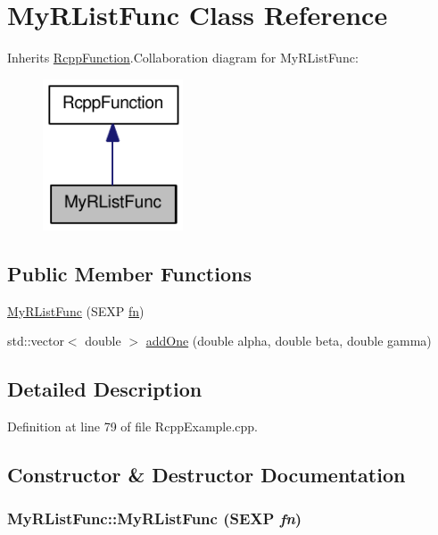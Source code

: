 \hypertarget{classMyRListFunc}{
\section{MyRListFunc Class Reference}
\label{classMyRListFunc}
}


Inherits \hyperlink{classRcppFunction}{RcppFunction}.Collaboration diagram for MyRListFunc:\nopagebreak
\begin{figure}[H]
\begin{center}
\leavevmode
\includegraphics[width=118pt]{classMyRListFunc__coll__graph}
\end{center}
\end{figure}
\subsection*{Public Member Functions}
\begin{DoxyCompactItemize}
\item 
\hyperlink{classMyRListFunc_a7ab78b186d110497a404f88009455af6}{MyRListFunc} (SEXP \hyperlink{classRcppFunction_aa6b5966224b8b7d158be6cdfc3612063}{fn})
\item 
std::vector$<$ double $>$ \hyperlink{classMyRListFunc_a0dec3b59e1e235c0502594a5d92cae13}{addOne} (double alpha, double beta, double gamma)
\end{DoxyCompactItemize}


\subsection{Detailed Description}


Definition at line 79 of file RcppExample.cpp.

\subsection{Constructor \& Destructor Documentation}
\hypertarget{classMyRListFunc_a7ab78b186d110497a404f88009455af6}{
\subsubsection[{MyRListFunc}]{\setlength{\rightskip}{0pt plus 5cm}MyRListFunc::MyRListFunc (SEXP {\em fn})}}
\label{classMyRListFunc_a7ab78b186d110497a404f88009455af6}


